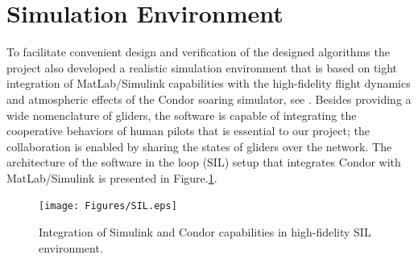 \documentclass{ifacconf}
\begin{document}
\section{Simulation Environment}
\label{sec:SimEnv}
To facilitate convenient design and verification of the designed algorithms the project also developed a realistic simulation environment that is based on tight integration of MatLab/Simulink capabilities with the high-fidelity flight dynamics and atmospheric effects of the Condor soaring simulator, see \cite{Condor:2013:Online}. Besides providing a wide nomenclature of gliders, the software is capable of integrating the cooperative behaviors of human pilots that is essential to our project; the collaboration is enabled by sharing the states of gliders over the network. The architecture of the software in the loop (SIL) setup that integrates Condor with MatLab/Simulink is presented in Figure.\ref{fig:SIL}. 


\begin{figure}[thpb]
  \centering
  \texttt{[image: Figures/SIL.eps]}
  \caption{Integration of Simulink and Condor capabilities in high-fidelity SIL environment.}
  \label{fig:SIL}
\end{figure}
\end{document}

